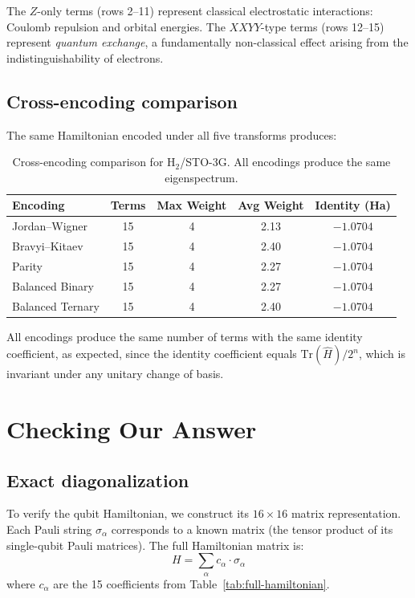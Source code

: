 \documentclass[aps,prb,preprint,longbibliography,nofootinbib]{revtex4-2}
\begin{document}
The $Z$-only terms (rows 2--11) represent classical electrostatic
interactions: Coulomb repulsion and orbital energies.  The
$XXYY$-type terms (rows 12--15) represent \emph{quantum exchange}, a
fundamentally non-classical effect arising from the indistinguishability
of electrons.

\subsection{Cross-encoding comparison}

The same Hamiltonian encoded under all five transforms produces:

\begin{table}[h]
\centering
\begin{tabular}{@{}lcccc@{}}
\toprule
\textbf{Encoding} & \textbf{Terms} & \textbf{Max Weight}
  & \textbf{Avg Weight} & \textbf{Identity (Ha)} \\
\midrule
Jordan--Wigner    & 15 & 4 & 2.13 & $-1.0704$ \\
Bravyi--Kitaev    & 15 & 4 & 2.40 & $-1.0704$ \\
Parity            & 15 & 4 & 2.27 & $-1.0704$ \\
Balanced Binary   & 15 & 4 & 2.27 & $-1.0704$ \\
Balanced Ternary  & 15 & 4 & 2.40 & $-1.0704$ \\
\bottomrule
\end{tabular}
\caption{Cross-encoding comparison for H$_2$/STO-3G.  All encodings
  produce the same eigenspectrum.}
\label{tab:cross-encoding}
\end{table}

All encodings produce the same number of terms with the same identity
coefficient, as expected, since the identity coefficient equals
$\text{Tr}(\hat{H})/2^n$, which is invariant under any unitary change
of basis.

\section{Checking Our Answer}
\label{sec:checking}

\subsection{Exact diagonalization}

To verify the qubit Hamiltonian, we construct its $16 \times 16$ matrix
representation.  Each Pauli string $\sigma_\alpha$ corresponds to a
known matrix (the tensor product of its single-qubit Pauli matrices).
The full Hamiltonian matrix is:
\begin{equation}
H = \sum_\alpha c_\alpha \cdot \sigma_\alpha
\end{equation}
where $c_\alpha$ are the 15 coefficients from Table~\ref{tab:full-hamiltonian}.
\end{document}
